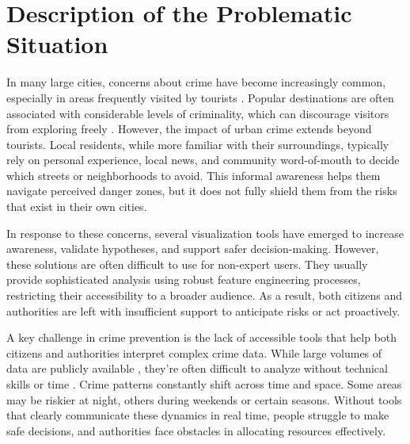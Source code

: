 \section{Description of the Problematic Situation}

In many large cities, concerns about crime have become increasingly common, especially in areas frequently visited by tourists \citep{SopikoTevdoradze2024CrimeTourism}. Popular destinations are often associated with considerable levels of criminality, which can discourage visitors from exploring freely \citep{Machado2012CrimeRJ}. However, the impact of urban crime extends beyond tourists. Local residents, while more familiar with their surroundings, typically rely on personal experience, local news, and community word-of-mouth to decide which streets or neighborhoods to avoid. This informal awareness helps them navigate perceived danger zones, but it does not fully shield them from the risks that exist in their own cities.


In response to these concerns, several visualization tools \citep{Garcia2022CriPAV, Salah2022BigCDVis, Silva2017CrimeVisAI, Garcia2020MiranteAV, Garcia2021CrimAnalyzer} have emerged to increase awareness, validate hypotheses, and support safer decision-making. However, these solutions are often difficult to use for non-expert users. They usually provide sophisticated analysis using robust feature engineering processes, restricting their accessibility to a broader audience. As a result, both citizens and authorities are left with insufficient support to anticipate risks or act proactively.

A key challenge in crime prevention is the lack of accessible tools that help both citizens and authorities interpret complex crime data. While large volumes of data are publicly available \citep{Zhang2025CrimeDatasetChina, NYCDataset, ChicagoDataset}, they're often difficult to analyze without technical skills or time \citep{Zengli2020CrimePatterns}. Crime patterns constantly shift across time and space. Some areas may be riskier at night, others during weekends or certain seasons. Without tools that clearly communicate these dynamics in real time, people struggle to make safe decisions, and authorities face obstacles in allocating resources effectively.

